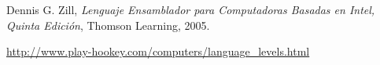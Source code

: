 

\begin{thebibliography}{9}

Dennis G. Zill, \textit{Lenguaje Ensamblador para Computadoras Basadas en Intel, Quinta Edición}, Thomson Learning, 2005. 

\url{http://www.play-hookey.com/computers/language_levels.html}


\end{thebibliography}

